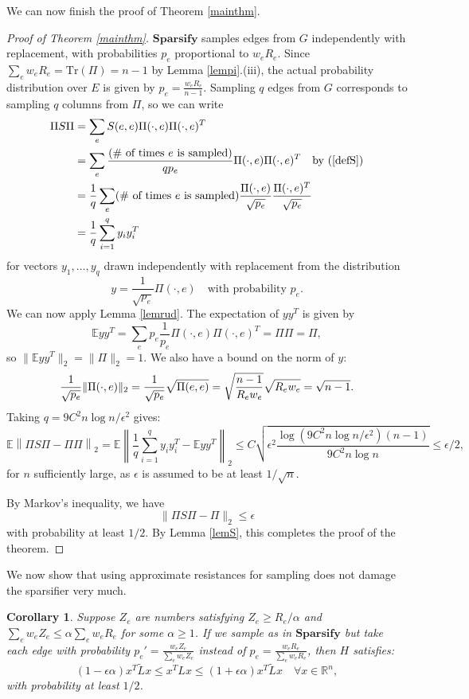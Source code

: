 \documentclass[11pt]{article}
\newtheorem{cor}[lem]{Corollary}
\newcommand{\E}{\mathbb{E}}
\newcommand{\R}{\mathbb{R}}
\begin{document}
\noindent We can now finish the proof of Theorem \ref{mainthm}.
\begin{proof}[Proof of Theorem \ref{mainthm}] 
$\mathbf{Sparsify}$ samples edges from $G$ independently with replacement,
with probabilities $p_e$ proportional to $w_eR_e$. Since 
$\sum_e w_eR_e=\textrm{Tr}(\Pi)=n-1$ by Lemma \ref{lempi}.(iii),
the actual probability distribution over $E$ is given by $p_e=\frac{w_eR_e}{n-1}$.
Sampling $q$ edges from $G$ corresponds to sampling $q$ columns from $\Pi$, so we can
write
\begin{align*}
\Pi S\Pi &= \sum_{e}S(e,e)\Pi(\cdot,e)\Pi(\cdot,e)^T
\\&=\sum_e \frac{(\#\textrm{ of times $e$ is
sampled})}{qp_e}\Pi(\cdot,e)\Pi(\cdot,e)^T\quad\textrm{by (\ref{defS})}
\\&=\frac{1}{q}\sum_{e} (\#\textrm{ of times $e$ is sampled})\frac{\Pi(\cdot,e)}{\sqrt{p_e}}\frac{\Pi(\cdot,e)^T}{\sqrt{p_e}}
\\&=\frac{1}{q}\sum_{i=1}^q y_iy_i^T\end{align*}
for vectors $y_1,\ldots, y_q$ drawn independently with replacement from the
distribution
\[ y = \frac{1}{\sqrt{p_e}}\Pi(\cdot,e) \quad\textrm{with probability } p_e.\] 
We can now apply Lemma \ref{lemrud}.  The expectation of $yy^T$ is given by
\[ \mathbb{E}yy^T = \sum_e p_e \frac{1}{p_e} \Pi(\cdot,e) \Pi(\cdot,e)^T =
\Pi\Pi = \Pi,\]
so $\|\mathbb{E}yy^T\|_2=\|\Pi\|_2=1$.
We also have a bound on the norm of $y$:
\[ \frac{1}{\sqrt{p_e}}\|\Pi(\cdot,e)\|_2 
= \frac{1}{\sqrt{p_e}}\sqrt{\Pi(e,e)}\\
= \sqrt{\frac{n-1}{R_ew_e}}\sqrt{R_ew_e}
= \sqrt{n-1}.\]
Taking $q=9C^2n\log n/\epsilon^2$ gives:
\[ \E \left\|\Pi S\Pi -\Pi\Pi\right\|_2 = \E \left\|\frac{1}{q}\sum_{i=1}^q
y_iy_i^T-\E yy^T\right\|_2\le
C\sqrt{\epsilon^2 \frac{\log (9C^2n\log n/\epsilon^2) (n-1)}{9C^2n\log n}} \le
\epsilon/2,\]
for $n$ sufficiently large, as $\epsilon$ is assumed to be at least $1/\sqrt{n}$.

By Markov's inequality, we have 
\[ \|\Pi S\Pi-\Pi\|_2\le\epsilon\]
with probability at least $1/2$. By Lemma \ref{lemS}, this completes the proof
of the theorem.
\end{proof}
We now show that using approximate resistances for sampling does not damage the 
  sparsifier very much.
\begin{cor} \label{approxok} Suppose $Z_e$ are numbers satisfying $Z_e\ge
R_e/\alpha$ and $\sum_e w_eZ_e\le \alpha \sum_e w_eR_e$ for some $\alpha\ge 1$. 
If we sample as in $\mathbf{Sparsify}$ but take each edge with probability
$p_e'=\frac{w_eZ_e}{\sum_e w_eZ_e}$ instead of $p_e=\frac{w_eR_e}{\sum_e
w_eR_e}$, then $H$ satisfies:
\[ (1-\epsilon\alpha)x^T\tilde{L}x\le x^TLx\le (1+\epsilon\alpha)x^T\tilde{L}x
\quad\forall x\in\R^n,\]
with probability at least $1/2$.
\end{cor}
\end{document}

